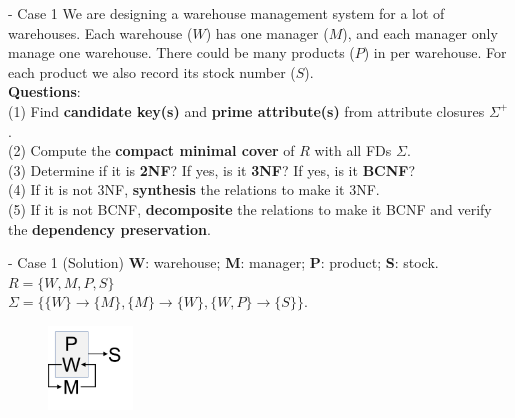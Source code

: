 \begin{frame}[fragile]{ - Case 1}
	We are designing a warehouse management system for a lot of warehouses. Each warehouse ($W$) has one manager ($M$), and each manager only manage one warehouse. There could be many products ($P$) in per warehouse. For each product we also record its stock number ($S$).\\\vspace{10pt}
	\textbf{Questions}:\\
	(1) Find \textbf{candidate key(s)} and \textbf{prime attribute(s)} from attribute closures $\Sigma^{+}$.\\
	(2) Compute the \textbf{compact minimal cover} of $R$ with all FDs $\Sigma$.\\
	(3) Determine if it is \textbf{2NF}? If yes, is it \textbf{3NF}? If yes, is it \textbf{BCNF}?\\
	(4) If it is not 3NF, \textbf{synthesis} the relations to make it 3NF.\\
	(5) If it is not BCNF, \textbf{decomposite} the relations to make it BCNF and verify the \textbf{dependency preservation}. 
\end{frame}

\begin{frame}[fragile]{ - Case 1 (Solution)}
	\textbf{W}: warehouse; \textbf{M}: manager;
	\textbf{P}: product; \textbf{S}: stock.\\\vspace{5pt}
	$R = \{W, M, P, S\}$\\
	$\Sigma = \{\{W\} \rightarrow \{M\}, \{M\} \rightarrow \{W\},
	\{W, P\} \rightarrow \{S\}\}$.\\\vspace{15pt}
	\begin{figure}
		\includegraphics[width=0.2\textwidth, trim=0 0 0 0, clip]{t5/images/case1.png}
	\end{figure}\vspace{-5pt}
\end{frame}

